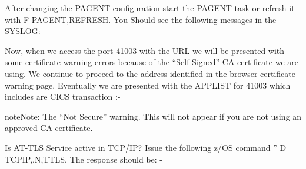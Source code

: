 \documentclass[letterpaper,10pt,english]{sphinxmanual}
\begin{document}
After changing the PAGENT configuration start the PAGENT task or refresh it with F PAGENT,REFRESH. You Should see the following messages in the SYSLOG: -

\begin{sphinxVerbatim}[commandchars=\\\{\}]
 
         
    
\end{sphinxVerbatim}

Now, when we access the port 41003 with the URL  we will be presented with some certificate warning errors because of the “Self-Signed” CA certificate we are using. We continue to proceed to the address identified in the browser certificate warning page. Eventually we are presented with the APPLIST for 41003 which includes are CICS transaction :-


\begin{sphinxadmonition}{note}{Note:}
The “Not Secure” warning. This will not appear if you are not using an approved CA certificate.
\end{sphinxadmonition}


Is AT-TLS Service active in TCP/IP? Issue the following z/OS command ” D TCPIP,,N,TTLS. The response should be: -

\begin{sphinxVerbatim}[commandchars=\\\{\}]
     
   
  
    
   
\end{sphinxVerbatim}

\end{document}
